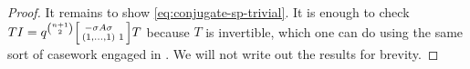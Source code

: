 \begin{proof}
    It remains to show \eqref{eq:conjugate-sp-trivial}. It is enough to check $TI=q^{\binom{n+1}2}\begin{bsmallmatrix}
        -\sigma A\sigma \\ (1,\ldots,1) & 1
    \end{bsmallmatrix}T$ because $T$ is invertible, which one can do using the same sort of casework engaged in . We will not write out the results for brevity.

\end{proof}

